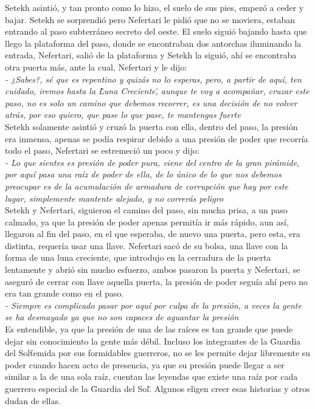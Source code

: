 Setekh asintió, y tan pronto como lo hizo, el suelo de sus pies, empezó a ceder y bajar. Setekh se sorprendió pero Nefertari le pidió que no se moviera, estaban entrando al paso subterráneo secreto del oeste. El suelo siguió bajando hasta que llego la plataforma del paso, donde se encontraban dos antorchas iluminando la entrada, Nefertari, salió de la plataforma y Setekh la siguió, ahí se encontraba otra puerta más, ante la cual, Nefertari y le dijo:\\
\textit{- ¿Sabes?, sé que es repentino y quizás no lo esperas, pero, a partir de aquí, ten cuidado, iremos hasta la \"Luna Creciente\", aunque te voy a acompañar, cruzar este paso, no es solo un camino que debemos recorrer, es una decisión de no volver atrás, por eso quiero, que pase lo que pase, te mantengas fuerte}\\
Setekh solamente asintió y cruzó la puerta con ella, dentro del paso, la presión era inmensa, apenas se podía respirar debido a una presión de poder que recorría todo el paso, Nefertari se estremeció un poco y dijo:\\
\textit{- Lo que sientes es presión de poder pura, viene del centro de la gran pirámide, por aquí pasa una raíz de poder de ella, de lo único de lo que nos debemos preocupar es de la acumulación de armadura de corrupción que hay por este lugar, simplemente mantente alejado, y no correrás peligro}\\
Setekh y Nefertari, siguieron el camino del paso, sin mucha prisa, a un paso calmado, ya que la presión de poder apenas permitía ir más rápido, aun así, llegaron al fin del paso, en el que esperaba, de nuevo una puerta, pero esta, era distinta, requería usar una llave.
Nefertari sacó de su bolsa, una llave con la forma de una luna creciente, que introdujo en la cerradura de la puerta lentamente y abrió sin mucho esfuerzo, ambos pasaron la puerta y Nefertari, se aseguró de cerrar con llave aquella puerta, la presión de poder seguía ahí pero no era tan grande como en el paso.\\
\textit{- Siempre es complicado pasar por aquí por culpa de la presión, a veces la gente se ha desmayado ya que no son capaces de aguantar la presión}\\
Es entendible, ya que la presión de una de las raíces es tan grande que puede dejar sin conocimiento la gente más débil. Incluso los integrantes de la \"Guardia del Sol\" temida por sus formidables guerreros, no se les permite dejar libremente su poder cuando hacen acto de presencia, ya que su presión puede llegar a ser similar a la de una sola raíz, cuentan las leyendas que existe una raíz por cada guerrero especial de la \"Guardia del Sol\". Algunos eligen creer esas historias y otros dudan de ellas.\\
